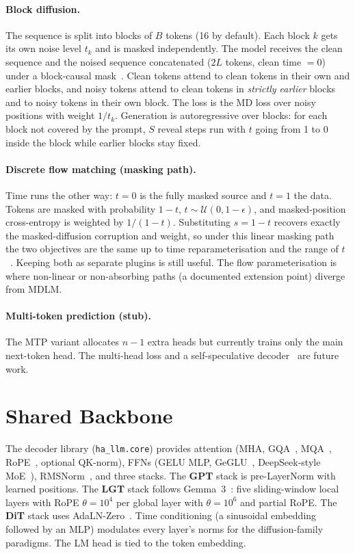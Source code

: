 \documentclass[11pt]{article}
\begin{document}
\paragraph{Block diffusion.} The sequence is split into blocks of $B$ tokens (16 by default).
Each block $k$ gets its own noise level $t_k$ and is masked independently. The model receives
the clean sequence and the noised sequence concatenated ($2L$ tokens, clean time $=0$) under a
block-causal mask~\cite{arriola2025bd3lm}. Clean tokens attend to clean tokens in their own
and earlier blocks, and noisy tokens attend to clean tokens in \emph{strictly earlier} blocks
and to noisy tokens in their own block. The loss is the MD loss over noisy positions with
weight $1/t_k$. Generation is autoregressive over blocks: for each block not covered by the
prompt, $S$ reveal steps run with $t$ going from 1 to 0 inside the block while earlier
blocks stay fixed.

\paragraph{Discrete flow matching (masking path).} Time runs the other way: $t=0$ is the fully
masked source and $t=1$ the data. Tokens are masked with probability $1-t$,
$t\sim\mathcal U(0,1-\epsilon)$, and masked-position cross-entropy is weighted by
$1/(1-t)$. Substituting $s=1-t$ recovers exactly the masked-diffusion corruption and
weight, so under this linear masking path the two objectives are the same up to time
reparameterisation and the range of $t$~\cite{gat2024dfm,shi2024md4}. Keeping both as separate
plugins is still useful. The flow parameterisation is where non-linear or
non-absorbing paths (a documented extension point) diverge from MDLM.

\paragraph{Multi-token prediction (stub).} The MTP variant allocates $n-1$ extra heads but
currently trains only the main next-token head. The multi-head loss and a self-speculative
decoder~\cite{gloeckle2024mtp} are future work.

\section{Shared Backbone}
\label{sec:backbone}

The decoder library (\texttt{ha\_llm.core}) provides attention (MHA, GQA~\cite{ainslie2023gqa},
MQA~\cite{shazeer2019mqa}, RoPE~\cite{su2021roformer}, optional QK-norm), FFNs (GELU MLP,
GeGLU~\cite{shazeer2020glu}, DeepSeek-style MoE~\cite{dai2024deepseekmoe}), RMSNorm~\cite{zhang2019rmsnorm},
and three stacks. The \textbf{GPT} stack is pre-LayerNorm with learned positions. The
\textbf{LGT} stack follows Gemma~3~\cite{gemma3}: five sliding-window local layers with RoPE
$\theta=10^4$ per global layer with $\theta=10^6$ and partial RoPE. The \textbf{DiT} stack uses
AdaLN-Zero~\cite{peebles2023dit}. Time conditioning (a sinusoidal embedding followed by an MLP)
modulates every layer's norms for the diffusion-family paradigms. The LM head is tied to the
token embedding.
\end{document}
